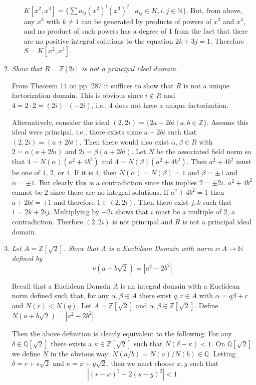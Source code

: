 \documentclass[10pt]{article}
\newcommand{\N}{\mathbb{N}}
\newcommand{\Z}{\mathbb{Z}}
\newcommand{\Q}{\mathbb{Q}}
\begin{document}
\begin{enumerate}
\begin{enumerate}
$K[x^2, x^3] = \{\sum a_{ij} (x^2)^i (x^3)^j \mid a_{ij} \in K, i,j \in \N\}$.  But, from above, any $x^k$ with $k \neq 1$ can be generated by products of powers of $x^2$ and $x^3$, and no product of such powers has a degree of $1$ from the fact that there are no positive integral solutions to the equation $2k + 3j = 1$.  Therefore $S = K[x^2, x^3]$.

\end{enumerate}

\item \emph{Show that $R=\Z[2i]$ is not a principal ideal domain.}

From Theorem 14 on pp. 287 it suffices to show that $R$ is not a unique factorization domain.  This is obvious since $i \notin R$ and $4 = 2 \cdot 2 = (2i) \cdot (-2i)$, i.e., $4$ does not have a unique factorization.

Alternatively, consider the ideal $(2, 2i) = \{2a + 2bi \mid a,b \in \Z\}$.  Assume this ideal were principal, i.e., there exists some $a+2bi$ such that $(2,2i) = (a+2bi)$.  Then there would also exist $\alpha, \beta \in R$ with $2 = \alpha(a+2bi)$ and $2i = \beta(a+2bi)$.  Let $N$ be the associated field norm so that $4 = N(\alpha)(a^2 + 4b^2)$ and $4 = N(\beta)(a^2 + 4b^2)$.  Then $a^2 + 4b^2$ must be one of $1$, $2$, or $4$.  If it is $4$, then $N(\alpha) = N(\beta) = 1$ and $\beta = \pm 1$ and $\alpha = \pm 1$.  But clearly this is a contradiction since this implies $2 = \pm 2i$.  $a^2 + 4b^2$ cannot be $2$ since there are no integral solutions.  If $a^2 + 4b^2 = 1$ then $a+2bi = \pm 1$ and therefore $1 \in (2, 2i)$.  Then there exist $j,k$ such that $1 = 2k + 2ij$.  Multiplying by $-2i$ shows that $i$ must be a multiple of $2$, a contradiction.  Therfore $(2, 2i)$ is not principal and $R$ is not a principal ideal domain.

\item \emph{Let $A = \Z[\sqrt{2}]$.  Show that $A$ is a Euclidean Domain with norm $\nu:A \rightarrow \N$ defined by $$\nu(a+b\sqrt{2}) = |a^2 - 2b^2|$$}

Recall that a Euclidean Domain $A$ is an integral domain with a Euclidean norm defined such that, for any $\alpha, \beta \in A$ there exist $q,r \in A$ with $\alpha = q\beta + r$ and $N(r) < N(q)$.  Let $A = \Z[\sqrt{2}]$ and $\alpha, \beta \in \Z[\sqrt{2}]$.  Define $N(a + b\sqrt{2}) = |a^2 - 2b^2|$.

Then the above definition is clearly equivalent to the following:  For any $\delta \in \Q[\sqrt{2}]$ there exists a $\kappa \in \Z[\sqrt{2}]$ such that $N(\delta - \kappa) < 1$.  On $\Q[\sqrt{2}]$ we define $N$ in the obvious way: $N(a/b) = N(a)/N(b) \in \Q$.  Letting $\delta = r + s\sqrt{2}$ and $\kappa = x + y\sqrt{2}$, then we must choose $x,y$ such that
\[
|(r-x)^2 - 2(s-y)^2| < 1
\]


\end{enumerate}
\end{document}
